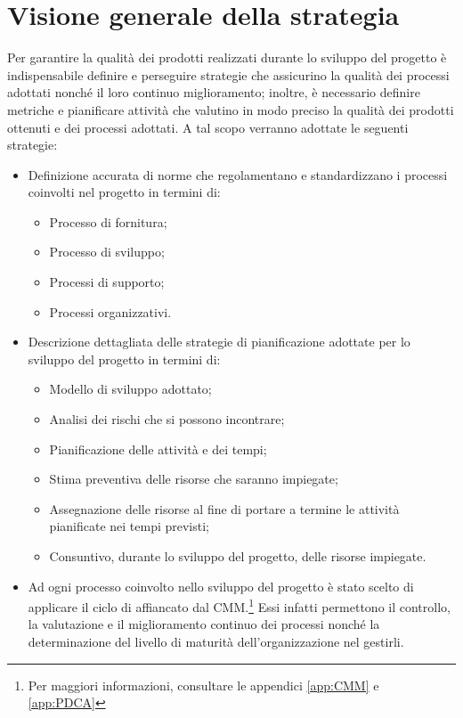 \documentclass[../PianoDiQualifica.tex]{subfiles}
\begin{document}
	\section{Visione generale della strategia}
		Per garantire la qualità dei prodotti realizzati durante lo sviluppo del
		progetto è indispensabile definire e perseguire strategie che assicurino la
		qualità dei processi adottati nonché il loro continuo miglioramento;
		inoltre, è necessario definire metriche e pianificare attività che valutino in
		modo preciso la qualità dei prodotti ottenuti e dei processi adottati. A tal
		scopo verranno adottate le seguenti strategie:
		\begin{itemize}
			\item Definizione accurata di norme che regolamentano e standardizzano i
			processi coinvolti nel progetto in termini di:
				\begin{itemize}
					\item Processo di fornitura;
					\item Processo di sviluppo;
					\item Processi di supporto;
					\item Processi organizzativi.
				\end{itemize}
			\item Descrizione dettagliata delle strategie di pianificazione adottate
			per lo sviluppo del progetto in termini di:
				\begin{itemize}
					\item Modello di sviluppo adottato;
					\item Analisi dei rischi che si possono incontrare;
					\item Pianificazione delle attività e dei tempi;
					\item Stima preventiva delle risorse che saranno impiegate;
					\item Assegnazione delle risorse al fine di portare a termine le
					attività pianificate nei tempi previsti;
					\item Consuntivo, durante lo sviluppo del progetto, delle risorse
					impiegate.
				\end{itemize}
			\item Ad ogni processo coinvolto nello sviluppo del progetto è stato scelto
			di applicare il ciclo di  affiancato dal CMM.\footnote{Per maggiori informazioni,
			consultare le appendici \ref{app:CMM} e \ref{app:PDCA}}
			Essi infatti permettono il controllo, la valutazione e il miglioramento
			continuo dei processi nonché la determinazione del livello di maturità
			dell'organizzazione nel gestirli.
		\end{itemize}
\end{document}
